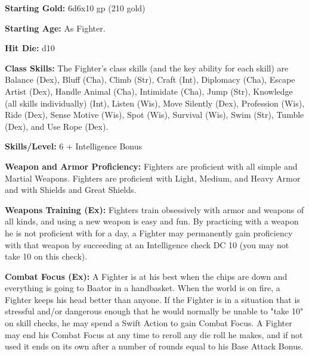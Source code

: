 \textbf{Starting Gold:} 6d6x10 gp (210 gold)

\textbf{Starting Age:} As Fighter.

\textbf{Hit Die:} d10

\textbf{Class Skills:} The Fighter's class skills (and the key ability for each skill) are Balance (Dex), Bluff (Cha), Climb (Str), Craft (Int), Diplomacy (Cha), Escape Artist (Dex), Handle Animal (Cha), Intimidate (Cha), Jump (Str), Knowledge (all skills individually) (Int), Listen (Wis), Move Silently (Dex), Profession (Wis), Ride (Dex), Sense Motive (Wis), Spot (Wis), Survival (Wis), Swim (Str), Tumble (Dex), and Use Rope (Dex).

\textbf{Skills/Level:} 6 + Intelligence Bonus

\goodbab{}
\goodfor{}
\goodref{}
\goodwil{}

\begin{classtable}
\end{classtable}

\classfeatures

\textbf{Weapon and Armor Proficiency:} Fighters are proficient with all simple and Martial Weapons. Fighters are proficient with Light, Medium, and Heavy Armor and with Shields and Great Shields.

\textbf{Weapons Training (Ex):} Fighters train obsessively with armor and weapons of all kinds, and using a new weapon is easy and fun. By practicing with a weapon he is not proficient with for a day, a Fighter may permanently gain proficiency with that weapon by succeeding at an Intelligence check DC 10 (you may not take 10 on this check).

\textbf{Combat Focus (Ex):} A Fighter is at his best when the chips are down and everything is going to Baator in a handbasket. When the world is on fire, a Fighter keeps his head better than anyone. If the Fighter is in a situation that is stressful and/or dangerous enough that he would normally be unable to "take 10" on skill checks, he may spend a Swift Action to gain Combat Focus. A Fighter may end his Combat Focus at any time to reroll any die roll he makes, and if not used it ends on its own after a number of rounds equal to his Base Attack Bonus.

